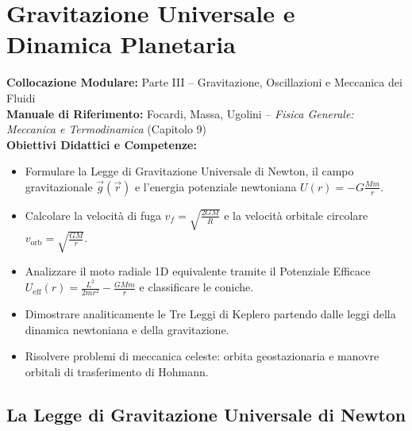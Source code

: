 \chapter{Gravitazione Universale e Dinamica Planetaria}
\label{chap:gravitazione_forze_centrali}

\begin{tcolorbox}[enhanced, breakable, colback=navyblue!4!white, colframe=navyblue!80!black,
    coltitle=white, fonttitle=\bfseries\sffamily, title={Quadro Sinottico del Capitolo 09},
    sharp corners, rounded corners=south, boxrule=1pt]
\textbf{Collocazione Modulare:} Parte III -- Gravitazione, Oscillazioni e Meccanica dei Fluidi\\
\textbf{Manuale di Riferimento:} Focardi, Massa, Ugolini -- \emph{Fisica Generale: Meccanica e Termodinamica} (Capitolo 9)\\
\textbf{Obiettivi Didattici e Competenze:}\par
\begin{itemize}
    \item Formulare la Legge di Gravitazione Universale di Newton, il campo gravitazionale $\vec{g}(\vec{r})$ e l'energia potenziale newtoniana $U(r) = -G\frac{Mm}{r}$.
    \item Calcolare la velocità di fuga $v_f = \sqrt{\frac{2GM}{R}}$ e la velocità orbitale circolare $v_{\text{orb}} = \sqrt{\frac{GM}{r}}$.
    \item Analizzare il moto radiale 1D equivalente tramite il Potenziale Efficace $U_{\text{eff}}(r) = \frac{L^2}{2mr^2} - \frac{GMm}{r}$ e classificare le coniche.
    \item Dimostrare analiticamente le Tre Leggi di Keplero partendo dalle leggi della dinamica newtoniana e della gravitazione.
    \item Risolvere problemi di meccanica celeste: orbita geostazionaria e manovre orbitali di trasferimento di Hohmann.
\end{itemize}
\end{tcolorbox}

\vspace{0.5em}

\section{La Legge di Gravitazione Universale di Newton}
\label{sec:legge_gravitazione}

